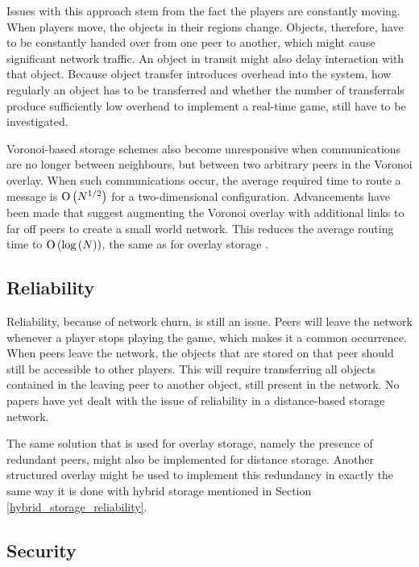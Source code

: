 Issues with this approach stem from the fact the players are constantly moving. When players move, the objects in their regions change. Objects, therefore, have to be constantly handed over from one peer to another, which might cause significant network traffic. An object in transit might also delay interaction with that object. Because object transfer introduces overhead into the system, how regularly an object has to be transferred and whether the number of transferrals produce sufficiently low overhead to implement a real-time game, still have to be investigated.

Voronoi-based storage schemes also become unresponsive when communications are no longer between neighbours, but between two arbitrary peers in the
Voronoi overlay. When such communications occur, the average required time to route a message is $\operatorname{O}\left(N^{1/2}\right)$ for a two-dimensional configuration.
Advancements have been made that suggest augmenting the Voronoi overlay with additional links to far off peers to create a small world network. This
reduces the average routing time to $\operatorname{O}\left(\log{(N)}\right)$, the same as for overlay storage \cite{Steiner_voronoi_shortcuts}.

\subsection{Reliability}

Reliability, because of network churn, is still an issue. Peers will leave the network whenever a player stops playing the game, which makes it a common occurrence. When peers leave the network, the objects that are stored on that peer should still be accessible to other players. This will require transferring all objects contained in the leaving peer to another object, still present in the network. No papers have yet dealt with the issue of reliability in a distance-based storage network.

The same solution that is used for overlay storage, namely the presence of redundant peers, might also be implemented for distance storage. Another structured overlay might be used to implement this redundancy in exactly the same way it is done with hybrid storage mentioned in Section \ref{hybrid_storage_reliability}.

\subsection{Security}
\label{distance_based_storage_security}

